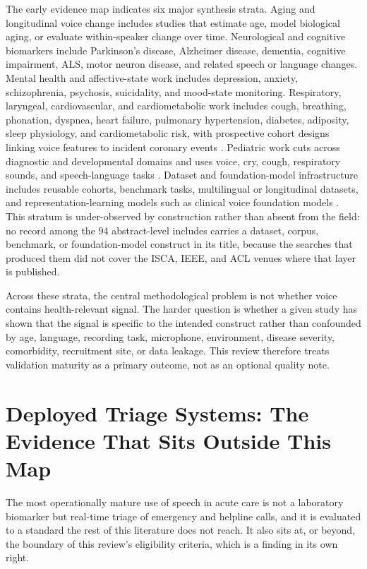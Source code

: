 \documentclass[11pt]{article}
\begin{document}
The early evidence map indicates six major synthesis strata. Aging and longitudinal voice change includes studies that estimate age, model biological aging, or evaluate within-speaker change over time. Neurological and cognitive biomarkers include Parkinson's disease, Alzheimer disease, dementia, cognitive impairment, ALS, motor neuron disease, and related speech or language changes. Mental health and affective-state work includes depression, anxiety, schizophrenia, psychosis, suicidality, and mood-state monitoring. Respiratory, laryngeal, cardiovascular, and cardiometabolic work includes cough, breathing, phonation, dyspnea, heart failure, pulmonary hypertension, diabetes, adiposity, sleep physiology, and cardiometabolic risk, with prospective cohort designs linking voice features to incident coronary events \citep{sara2022voice}. Pediatric work cuts across diagnostic and developmental domains and uses voice, cry, cough, respiratory sounds, and speech-language tasks \citep{rogers2024pediatric}. Dataset and foundation-model infrastructure includes reusable cohorts, benchmark tasks, multilingual or longitudinal datasets, and representation-learning models such as clinical voice foundation models \citep{marmor2026voxknesset,elemento2026voicefm}. This stratum is under-observed by construction rather than absent from the field: no record among the 94 abstract-level includes carries a dataset, corpus, benchmark, or foundation-model construct in its title, because the searches that produced them did not cover the ISCA, IEEE, and ACL venues where that layer is published.

Across these strata, the central methodological problem is not whether voice contains health-relevant signal. The harder question is whether a given study has shown that the signal is specific to the intended construct rather than confounded by age, language, recording task, microphone, environment, disease severity, comorbidity, recruitment site, or data leakage. This review therefore treats validation maturity as a primary outcome, not as an optional quality note.

\section{Deployed Triage Systems: The Evidence That Sits Outside This Map}

The most operationally mature use of speech in acute care is not a laboratory
biomarker but real-time triage of emergency and helpline calls, and it is
evaluated to a standard the rest of this literature does not reach. It also sits
at, or beyond, the boundary of this review's eligibility criteria, which is a
finding in its own right.
\end{document}
